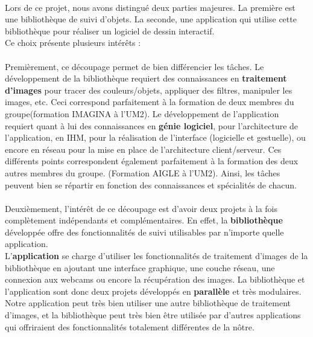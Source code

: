 \documentclass{report}
\begin{document}
			\paragraph{}
			Lors de ce projet, nous avons distingué deux parties majeures. La première est une bibliothèque de suivi d'objets. La seconde, une application qui utilise cette bibliothèque pour réaliser un logiciel de dessin interactif. \\
			Ce choix présente plusieurs intérêts :
			\paragraph{}
			Premièrement, ce découpage permet de bien différencier les tâches. Le développement de la bibliothèque requiert des connaissances en \textbf{traitement d'images} pour tracer des couleurs/objets, appliquer des filtres, manipuler les images, etc. Ceci correspond parfaitement à la formation de deux membres du groupe(formation IMAGINA à l'UM2). 
			Le développement de l'application requiert quant à lui des connaissances en \textbf{génie logiciel}, pour l'architecture de l'application, en IHM, pour la réalisation de l'interface (logicielle et gestuelle), ou encore en réseau pour la mise en place de l'architecture client/serveur. 
			Ces différents points correspondent également parfaitement à la formation des deux autres membres du groupe. (Formation AIGLE à l'UM2). Ainsi, les tâches peuvent bien se répartir en fonction des connaissances et spécialités de chacun.
				\paragraph{}
				Deuxièmement, l'intérêt de ce découpage est d'avoir deux projets à la fois complètement indépendants et complémentaires. En effet, la \textbf{bibliothèque} développée offre des fonctionnalités de suivi utilisables par n'importe quelle application.\\
				L'\textbf{application} se charge d'utiliser les fonctionnalités de traitement d'images de la bibliothèque en ajoutant une interface graphique, une couche réseau, une connexion aux webcams ou encore la récupération des images.
				La bibliothèque et l'application sont donc deux projets développés en \textbf{parallèle} et très modulaires. Notre application peut très bien utiliser une autre bibliothèque de traitement d'images, et la bibliothèque peut très bien être utilisée par d'autres applications qui offriraient des fonctionnalités totalement différentes de la nôtre.
\end{document}
